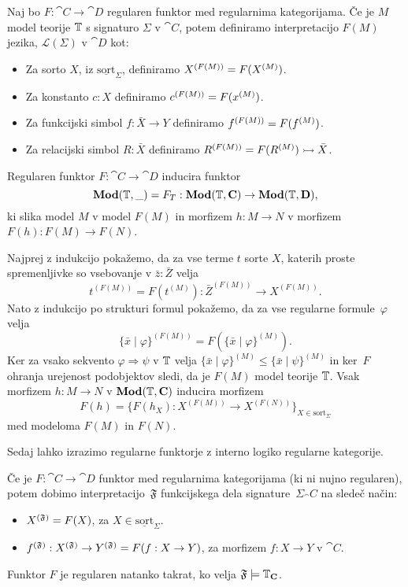 \documentclass[../kategoricna_logika.tex]{subfiles}
\begin{document}
\begin{definicija}
  Naj bo $F : \cat{C} \to \cat{D}$ regularen funktor med regularnima
  kategorijama.  Če je $M$ model teorije $\T$ s signaturo $\Sigma$ v $\cat{C}$, potem definiramo interpretacijo
  $F(M)$ jezika, $\mathcal{L}(\Sigma)$ v $\cat{D}$ kot:
  \begin{itemize}
  \item Za sorto $X$, iz $\underline{\mathrm{sort}}_\Sigma$,
    definiramo $\interp[F(M)]{X} = F(\interp{X})$.
  \item Za konstanto $c:X$ definiramo
    $\interp[F(M)]{c} = F(\interp{x})$.
  \item Za funkcijski simbol $f : \bar{X} \to Y$ definiramo
    $\interp[F(M)]{f} = F(\interp{f})$.
  \item Za relacijski simbol $R : \bar{X}$ definiramo
    $\interp[F(M)]{R} = F(\interp{R}) \rightarrowtail \bar{X}$.
  \end{itemize}
\end{definicija}
\begin{lema}\label{lema:regularen-funktor-slika-model-v-model}
  Regularen funktor $F : \cat{C} \to \cat{D}$ inducira funktor
  $$\Mod(\T, \_)=F_T : \Mod(\T,\cat{C}) \to \Mod(\T, \cat{D}),$$
  ki slika model $M$ v model $F(M)$ in morfizem $h : M \to N$ v
  morfizem $F(h) : F(M) \to F(N)$.
\end{lema}
\begin{dokaz}
  Najprej z indukcijo pokažemo, da za vse terme $t$ sorte $X$, katerih
  proste spremenljivke so vsebovanje v $\bar{z} : \bar{Z}$ velja
  \[ t^{(F(M))} = F(t^{(M)}) : \bar{Z}^{(F(M))} \to X^{(F(M))}.\] Nato
  z indukcijo po strukturi formul pokažemo, da za vse regularne
  formule~$\varphi$ velja
  \[ \{ \bar{x} \mid \varphi\}^{(F(M))} = F(\{\bar{x} \mid \varphi
    \}^{(M)}).\] Ker za vsako sekvento $\varphi \Rightarrow \psi$ v
  $\T$ velja
  $\{\bar{x} \mid \varphi\}^{(M)} \leq \{\bar{x} \mid \psi \}^{(M)}$
  in ker~$F$ ohranja urejenost podobjektov sledi, da je $F(M)$ model
  teorije $\T$. Vsak morfizem $h : M \to N$ v $\Mod(\T, \cat{C})$
  inducira morfizem
  \[ F(h) = \{ F(h_X) : X^{(F(M))} \to X^{(F(N))}\}_{X \in
      \mathrm{sort}_{\Sigma}}\] med modeloma $F(M)$ in $F(N)$.
\end{dokaz}
Sedaj lahko izrazimo regularne funktorje z interno
logiko regularne kategorije.
\begin{lema}\label{lema:regularen-funktor-v-interni-logiki}
  Če je $F : \cat{C} \to \cat{D}$ funktor med regularnima kategorijama
  (ki ni nujno regularen), potem dobimo interpretacijo~$\mathfrak{F}$
  funkcijskega dela signature~$\Sigma_\cat{C}$ na sledeč način:
  \begin{itemize}
  \item $\interp[\mathfrak{F}]{X} = F(X)$, za
    $X \in \underline{\mathrm{sort}}_{\Sigma}$.
  \item
    $\interp[\mathfrak{F}]{f} : \interp[\mathfrak{F}]{X} \to
    \interp[\mathfrak{F}]{Y} = F(f : X \to Y)$, za morfizem
    $f: X \to Y$ v $\cat{C}$.
  \end{itemize}
  Funktor $F$ je regularen natanko takrat, ko velja
  $\mathfrak{F} \models \T_\cat{C}$.
\end{lema}
\end{document}
